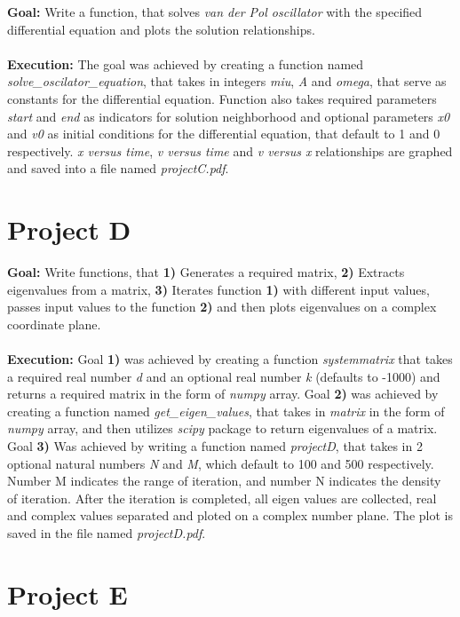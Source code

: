 \documentclass[a4paper,12pt]{article}
\begin{document}
\textbf{Goal:} Write a function, that solves \textit{van der Pol oscillator} with the specified differential equation and plots the solution relationships. \\ \\ \textbf{Execution:} The goal was achieved by creating a function named \textit{solve\_oscilator\_equation}, that takes in integers \textit{miu}, \textit{A} and \textit{omega}, that serve as constants for the differential equation. Function also takes required parameters \textit{start} and \textit{end} as indicators for solution neighborhood and optional parameters \textit{x0} and \textit{v0} as initial conditions for the differential equation, that default to 1 and 0 respectively. \textit{x versus time}, \textit{v versus time} and \textit{v versus x} relationships are graphed and saved into a file named \textit{projectC.pdf}. 


\section{Project D}

\textbf{Goal:} Write functions, that \textbf{1)} Generates a required matrix, \textbf{2)} Extracts eigenvalues from a matrix, \textbf{3)} Iterates function \textbf{1)} with different input values, passes input values to the function \textbf{2)} and then plots eigenvalues on a complex coordinate plane. \\ \\ \textbf{Execution:} Goal \textbf{1)} was achieved by creating a function \textit{systemmatrix} that takes a required real number \textit{d} and an optional real number \textit{k} (defaults to -1000) and returns a required matrix in the form of \textit{numpy} array. Goal \textbf{2)} was achieved by creating a function named \textit{get\_eigen\_values}, that takes in \textit{matrix} in the form of \textit{numpy} array, and then utilizes \textit{scipy} package to return eigenvalues of a matrix. Goal \textbf{3)} Was achieved by writing a function named \textit{projectD}, that takes in 2 optional natural numbers \textit{N} and \textit{M}, which default to 100 and 500 respectively. Number M indicates the range of iteration, and number N indicates the density of iteration. After the iteration is completed, all eigen values are collected, real and complex values separated and ploted on a complex number plane. The plot is saved in the file named \textit{projectD.pdf}.

\section{Project E}
\end{document}
